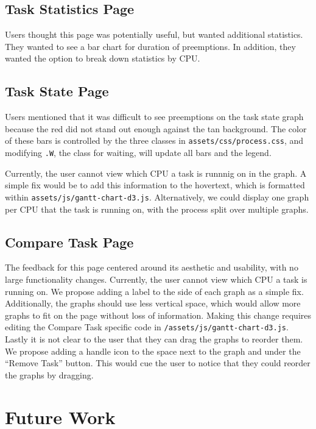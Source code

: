 \documentclass{hmcclinic}
\begin{document}
  \section{Task Statistics Page}

  Users thought this page was potentially useful, but wanted additional
  statistics. They wanted to see a bar chart for duration of preemptions. In
  addition, they wanted the option to break down statistics by CPU.

  \section{Task State Page}

  Users mentioned that it was difficult to see preemptions on the 
  task state graph because the red did not stand out enough against the tan background. 
  The color of these bars is controlled by the three classes in 
  \texttt{assets/css/process.css}, and modifying \texttt{.W}, the class for 
  waiting, will update all bars and the legend.

  Currently, the user cannot view which CPU a task is runnnig on in the graph. 
  A simple fix would be to add this information to the hovertext, which is 
  formatted within \texttt{assets/js/gantt-chart-d3.js}. Alternatively, we 
  could display one graph per CPU that the task is running on, with the 
  process split over multiple graphs.

  \section{Compare Task Page}
  The feedback for this page centered around its aesthetic and usability, with no 
  large functionality changes. Currently, the user cannot view which CPU a task 
  is running on. We propose adding a label to the side of each graph as a simple 
  fix. Additionally, the graphs should use less vertical space, which would allow more graphs to fit on the page without loss of 
  information. Making this change requires editing the Compare Task specific 
  code in \texttt{/assets/js/gantt-chart-d3.js}. Lastly it is not clear to the
   user that they can drag the graphs to reorder them. We propose adding a 
   handle icon to the space next to the graph and under the ``Remove Task'' 
   button. This would cue the user to notice that they could reorder the graphs 
   by dragging. 


\chapter{Future Work}
\end{document}
